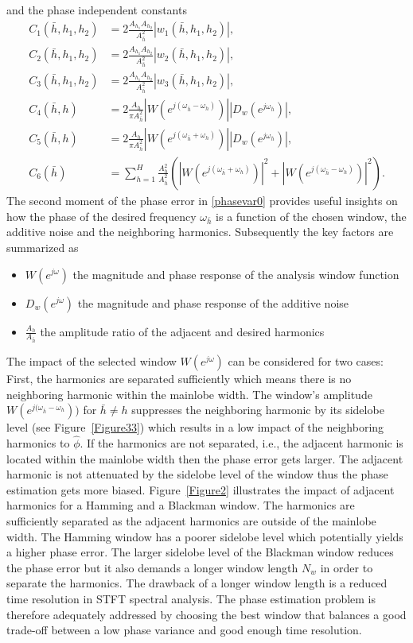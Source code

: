 and the phase independent constants 
\begin{equation}
\begin{split}
C_1(\bar{h},h_1,h_2)&=2\frac{A_{h_1} A_{h_2}}{A^2_{\bar{h}}}|w_1(\bar{h},h_1,h_2)|,\\
C_2(\bar{h},h_1,h_2)&=2\frac{A_{h_1} A_{h_2}}{A^2_{\bar{h}}}|w_2(\bar{h},h_1,h_2)|,\\
C_3(\bar{h},h_1,h_2)&=2\frac{A_{h_1} A_{h_2}}{A^2_{\bar{h}}}|w_3(\bar{h},h_1,h_2)|,\\
C_4(\bar{h},h)&=2\frac{A_h}{\pi A^2_{\bar{h}}}|W(e^{j(\omega_{\bar{h}}-\omega_h)})||D_w(e^{j\omega_{\bar{h}}})|,\\
C_5(\bar{h},h)&=2\frac{A_h}{\pi A^2_{\bar{h}}}|W(e^{j(\omega_{\bar{h}}+\omega_h)})||D_w(e^{j\omega_{\bar{h}}})|,\\
C_6(\bar{h})&=\sum_{h=1}^H \frac{A_h^2}{A_{\bar{h}}^2}\left( |W(e^{j(\omega_{\bar{h}}+\omega_{{h}})})|^2+|W(e^{j(\omega_{\bar{h}}-\omega_{{h}})})|^2 \right).
\end{split}
\end{equation}
The second moment of the phase error in \eqref{phasevar0} provides useful insights on how the phase of the desired frequency $\omega_{\bar{h}}$ is a function of the chosen window, the additive noise and the neighboring harmonics. Subsequently the key factors are summarized as
\begin{itemize}
	\item $W(e^{j\omega})$ the magnitude and phase response of the analysis window function
	\item $D_w(e^{j\omega})$ the magnitude and phase response of the additive noise
	\item $\frac{A_h}{A_{\bar{h}}}$ the amplitude ratio of the adjacent and desired harmonics
\end{itemize}
The impact of the selected window $W(e^{j\omega})$ can be considered for two cases: First, the harmonics are separated sufficiently which means there is no neighboring harmonic within the mainlobe width. The window's amplitude $W(e^{j(\omega_{\bar{h}}-\omega_h}))$ for $\bar{h}\neq h$ suppresses the neighboring harmonic by its sidelobe level (see Figure~\ref{Figure33}) which results in a low impact of the neighboring harmonics to $\hat{\phi}$. If the harmonics are not separated, i.e., the adjacent harmonic is located within the mainlobe width then the phase error gets larger. The adjacent harmonic is not attenuated by the sidelobe level of the window thus the phase estimation gets more biased. Figure~\ref{Figure2}
 illustrates the impact of adjacent harmonics for a Hamming and a Blackman window. The harmonics are sufficiently separated as the adjacent harmonics are outside of the mainlobe width. The Hamming window has a poorer sidelobe level which potentially yields a higher phase error. The larger 
sidelobe level
of the Blackman window reduces the phase error but it also demands a longer window length $N_w$ in order to separate the harmonics. The drawback of a longer window length is a reduced time resolution in STFT spectral analysis. The phase estimation problem is therefore adequately addressed by choosing the best window that balances a good trade-off between a low phase variance and good enough time resolution.
